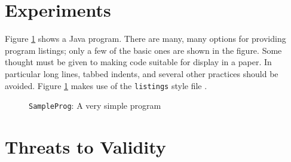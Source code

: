 \section{Experiments}

Figure \ref{javaprog} shows a Java program. There are many, many options for
providing program listings; only a few of the basic ones are shown
in the figure. Some thought must be given to making code suitable
for display in a paper. In particular long lines, tabbed indents, and
several other practices should be avoided. Figure \ref{javaprog} makes
use of the {\tt listings} style file .



\begin{figure}[htbp]
\centering

\caption{{\tt SampleProg}: A very simple program}
\label{javaprog}
\end{figure}

\section{Threats to Validity}

